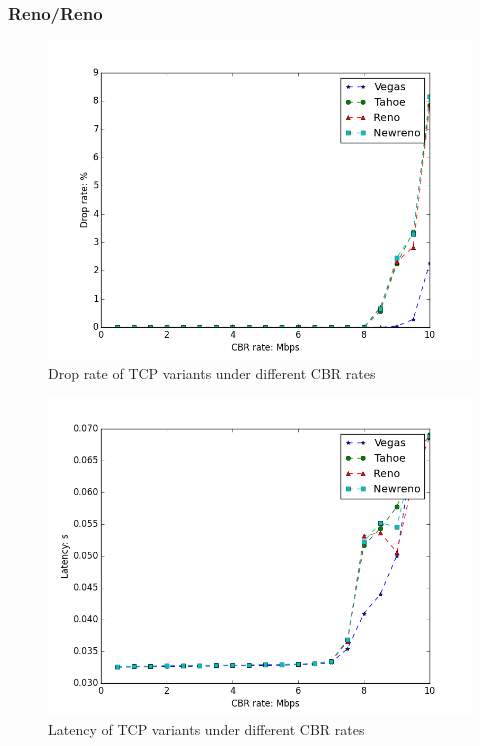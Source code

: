 \documentclass[10pt, conference]{IEEEtran/IEEEtran}
\begin{document}
\subsubsection{Reno/Reno}
\begin{figure}
\begin{center}
\includegraphics[width=\linewidth]{../exp1/exp1_drop.png}
\caption{Drop rate of TCP variants under different CBR rates}
\label{exp1_drop}
\end{center}
\end{figure}

\begin{figure}[htbp]
\begin{center}
\includegraphics[width=\linewidth]{../exp1/exp1_lat.png}
\caption{Latency of TCP variants under different CBR rates}
\label{exp1_lat}
\end{center}
\end{figure}
\end{document}
